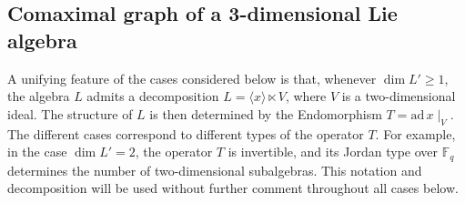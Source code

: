 \documentclass[11pt]{amsart}
\theoremstyle{plain}
\def\F{\mathbb{F}}
\def\ad{\mathrm{ad}}
\begin{document}



 

 


\subsection{Comaximal graph of a 3-dimensional Lie algebra}
A unifying feature of the cases considered below is that, whenever $\dim L' \geq 1$, the algebra $L$ admits a decomposition $L = \langle x \rangle \ltimes V$, where $V$ is a two-dimensional ideal. The structure of $L$ is then determined by the Endomorphism $T = \ad\, x\mid_V$. The different cases correspond to different types of the operator $T$. For example, in the case $\dim L' = 2$, the operator $T$ is invertible, and its Jordan type over $\F_q$ determines the number of two-dimensional subalgebras. This notation and decomposition will be used without further comment throughout all cases below.

\smallskip
\end{document}
